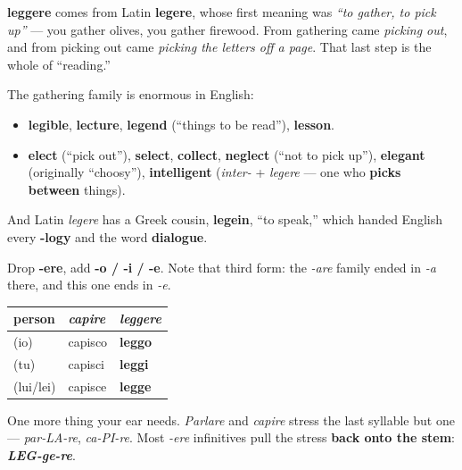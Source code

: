 \begin{cousinweb}
\textbf{leggere} comes from Latin \textbf{legere}, whose first meaning was \emph{\textquotedblleft{}to gather, to pick up\textquotedblright{}} — you gather olives, you gather firewood. From gathering came \emph{picking out}, and from picking out came \emph{picking the letters off a page}. That last step is the whole of \textquotedblleft{}reading.\textquotedblright{}

The gathering family is enormous in English:

\begin{itemize}
\raggedright
  \item \textbf{legible}, \textbf{lecture}, \textbf{legend} (\textquotedblleft{}things to be read\textquotedblright{}), \textbf{lesson}.
  \item \textbf{elect} (\textquotedblleft{}pick out\textquotedblright{}), \textbf{select}, \textbf{collect}, \textbf{neglect} (\textquotedblleft{}not to pick up\textquotedblright{}), \textbf{elegant} (originally \textquotedblleft{}choosy\textquotedblright{}), \textbf{intelligent} (\emph{inter-} + \emph{legere} — one who \textbf{picks between} things).
\end{itemize}

And Latin \emph{legere} has a Greek cousin, \textbf{legein}, \textquotedblleft{}to speak,\textquotedblright{} which handed English every \textbf{-logy} and the word \textbf{dialogue}.
\end{cousinweb}

\begin{grammarlens}[title={Grammar Lens: the -ere family, and where the stress lands}]
Drop \textbf{-ere}, add \textbf{-o / -i / -e}. Note that third form: the \emph{-are} family ended in \emph{-a} there, and this one ends in \emph{-e}.

\noindent
\begin{tabularx}{\linewidth}{@{}>{\raggedright\arraybackslash}X>{\raggedright\arraybackslash}X>{\raggedright\arraybackslash}X@{}}
\toprule
\textbf{person} & \textbf{\emph{capire}} & \textbf{\emph{leggere}} \\
\midrule
(io) & capisco & \textbf{leggo} \\
(tu) & capisci & \textbf{leggi} \\
(lui/lei) & capisce & \textbf{legge} \\
\bottomrule
\end{tabularx}

One more thing your ear needs. \emph{Parlare} and \emph{capire} stress the last syllable but one — \emph{par-LA-re}, \emph{ca-PI-re}. Most \emph{-ere} infinitives pull the stress \textbf{back onto the stem}: \emph{\textbf{LEG-ge-re}}.
\end{grammarlens}

